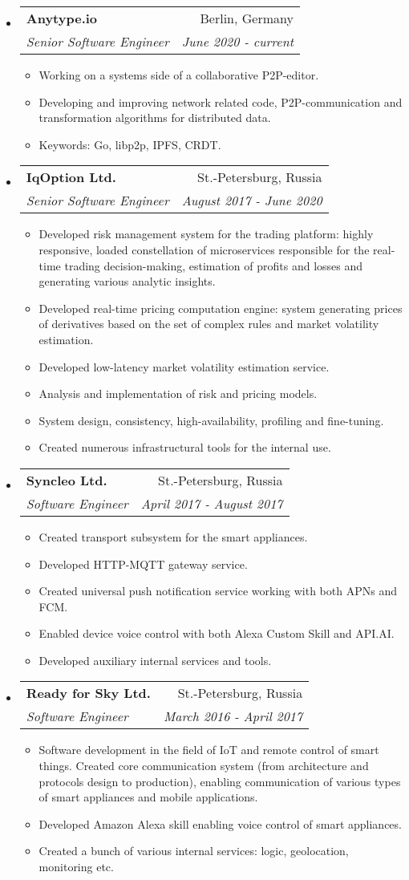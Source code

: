 \documentclass[letterpaper,11pt]{article}
\makeatletter
\newcommand{\resitem}[1]{\item #1 \vspace{-2pt}}
\newcommand{\ressubheading}[4]{
\begin{tabular*}{6.5in}{l@{\cftdotfill{\cftsecdotsep}\extracolsep{\fill}}r}
		\textbf{#1} & #2 \\
		\textit{#3} & \textit{#4} \\
\end{tabular*}\vspace{-6pt}}
\makeatother
\begin{document}
\begin{itemize}

\item
	\ressubheading{Anytype.io}{Berlin, Germany}{Senior Software Engineer}{June 2020 - current}
	\begin{itemize}
		\resitem{Working on a systems side of a collaborative P2P-editor.}
		\resitem{Developing and improving network related code, P2P-communication and transformation algorithms for distributed data.}
		\resitem{Keywords: Go, libp2p, IPFS, CRDT.}
	\end{itemize}

\item
	\ressubheading{IqOption Ltd.}{St.-Petersburg, Russia}{Senior Software Engineer}{August 2017 - June 2020}
	\begin{itemize}
		\resitem{Developed risk management system for the trading platform: highly responsive, loaded constellation of microservices responsible for the real-time trading decision-making, estimation of profits and losses and generating various analytic insights.}
		\resitem{Developed real-time pricing computation engine: system generating prices of derivatives based on the set of complex rules and market volatility estimation.}
		\resitem{Developed low-latency market volatility estimation service.}
		\resitem{Analysis and implementation of risk and pricing models.}
		\resitem{System design, consistency, high-availability, profiling and fine-tuning.}
		\resitem{Created numerous infrastructural tools for the internal use.}
	\end{itemize}

\item
	\ressubheading{Syncleo Ltd.}{St.-Petersburg, Russia}{Software Engineer}{April 2017 - August 2017}
	\begin{itemize}
		\resitem{Created transport subsystem for the smart appliances.}
		\resitem{Developed HTTP-MQTT gateway service.}
		\resitem{Created universal push notification service working with both APNs and FCM.}
		\resitem{Enabled device voice control with both Alexa Custom Skill and API.AI.}
		\resitem{Developed auxiliary internal services and tools.}
	\end{itemize}

\item 
	\ressubheading{Ready for Sky Ltd.}{St.-Petersburg, Russia}{Software Engineer}{March 2016 - April 2017}
	\begin{itemize}
		\resitem{Software development in the field of IoT and remote control of smart things. Created core communication system (from architecture and protocols design to production), enabling communication of various types of smart appliances and mobile applications.}
		\resitem{Developed Amazon Alexa skill enabling voice control of smart appliances.}
		\resitem{Created a bunch of various internal services: logic, geolocation, monitoring etc.}
	\end{itemize}


\end{itemize}
\end{document}
